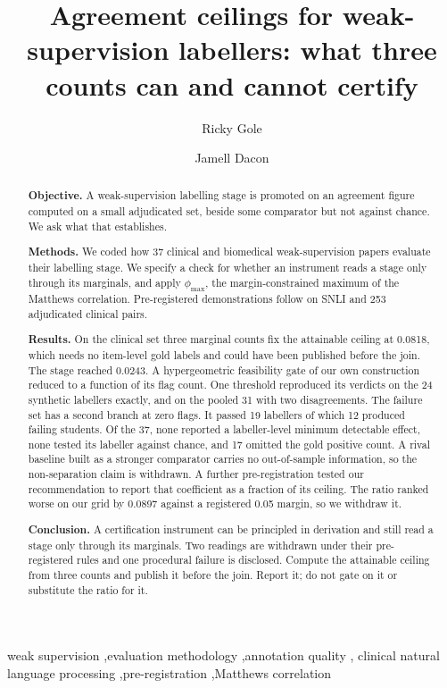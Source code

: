 \documentclass[review]{elsarticle}
\begin{document}
\linenumbers

\begin{frontmatter}

\title{Agreement ceilings for weak-supervision labellers: what three counts
can and cannot certify}

\author[a]{Ricky Gole}
\author[a]{Jamell Dacon}
\address[a]{Morgan State University, 1700 East Cold Spring Lane, Baltimore,
MD 21251, United States}

\begin{abstract}
\textbf{Objective.} A weak-supervision labelling stage is promoted on an
agreement figure computed on a small adjudicated set, beside some comparator
but not against chance. We ask what that establishes.

\textbf{Methods.} We coded how 37 clinical and biomedical weak-supervision
papers evaluate their labelling stage. We specify a check for whether an
instrument reads a stage only through its marginals, and apply $\phi_{\max}$,
the margin-constrained maximum of the Matthews correlation. Pre-registered demonstrations follow on SNLI and 253 adjudicated
clinical pairs.

\textbf{Results.} On the clinical set three marginal counts fix the attainable
ceiling at 0.0818, which needs no item-level gold labels and could have been
published before the join. The stage reached 0.0243. A hypergeometric
feasibility gate of our own construction reduced to a function of its flag
count. One threshold reproduced its verdicts on the 24 synthetic labellers
exactly, and on the pooled 31 with two disagreements. The failure set has a
second branch at zero flags. It passed 19 labellers of which 12 produced failing
students. Of the 37, none reported a labeller-level minimum detectable effect,
none tested its labeller against chance, and 17 omitted the gold positive count.
A rival baseline built as a stronger comparator carries no out-of-sample
information, so the non-separation claim is withdrawn. A further pre-registration tested our
recommendation to report that coefficient as a fraction of its ceiling. The
ratio ranked worse on our grid by 0.0897 against a registered 0.05 margin, so we
withdraw it.

\textbf{Conclusion.} A certification instrument can be principled in derivation
and still read a stage only through its marginals. Two readings are withdrawn
under their pre-registered rules and one procedural failure is disclosed.
Compute the attainable ceiling from three counts and publish it before the join.
Report it; do not gate on it or substitute the ratio for it.
\end{abstract}

\begin{keyword}
weak supervision \sep evaluation methodology \sep annotation quality \sep
clinical natural language processing \sep pre-registration \sep Matthews correlation
\end{keyword}

\end{frontmatter}
\end{document}
